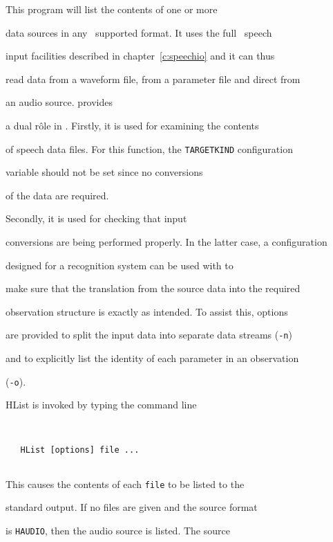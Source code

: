 This program will list the contents of one or more


data sources in any \HTK\ supported format.  It uses the full \HTK\ speech


input facilities described in chapter~\ref{c:speechio} and it can thus


read data from a waveform file, from a parameter file and direct from


an audio source.   provides


a dual r\^{o}le in \HTK.  Firstly, it is used for examining the contents


of speech data files.  For this function, the \texttt{TARGETKIND} configuration


variable should not be set since no conversions


of the data are required.


Secondly, it is used for checking that input 


conversions are being performed properly.  In the latter case, a configuration


designed for a recognition system can be used with  to


make sure that the translation from the source data into the required


observation structure is exactly as intended.  To assist  this, options


are provided to split the input data into separate data streams (\texttt{-n})


and to explicitly list the identity of each parameter in an observation


(\texttt{-o}).










HList is invoked by typing the command line


\begin{verbatim}


   HList [options] file ...


\end{verbatim}


This causes the contents of each {\tt file} to be listed to the


standard output.  If no files are given and the source format


is \texttt{HAUDIO}, then the audio source is listed.  The source


